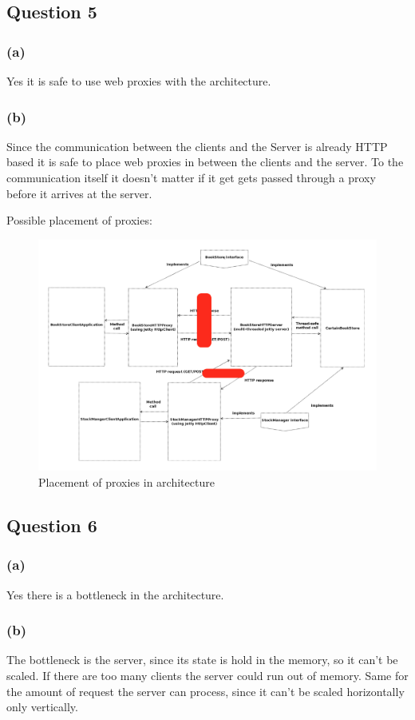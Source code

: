 \documentclass[12pt,a4paper]{article}
\begin{document}
\subsection{Question 5}
\subsubsection{(a)}
Yes it is safe to use web proxies with the architecture.
\subsubsection{(b)}
Since the communication between the clients and the Server is already HTTP based it is safe to place web proxies in between the clients and the server.
To the communication itself it doesn't matter if it get gets passed through a proxy before it arrives at the server.

Possible placement of proxies:
\begin{figure}[htb!]
	\includegraphics[width=\textwidth]{proxies}
	\caption{Placement of proxies in architecture}
\end{figure}

\subsection{Question 6}
\subsubsection{(a)}
Yes there is a bottleneck in the architecture.
\subsubsection{(b)}
The bottleneck is the server, since its state is hold in the memory, so it can't be scaled. If there are too many clients the server could run out of memory.
Same for the amount of request the server can process, since it can't be scaled horizontally only vertically.
\end{document}
